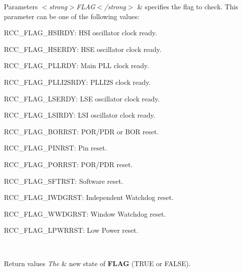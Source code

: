 \begin{DoxyParams}{Parameters}
{\em $<$strong$>$\+F\+L\+A\+G$<$/strong$>$} & specifies the flag to check. This parameter can be one of the following values\+: \begin{DoxyItemize}
\item R\+C\+C\+\_\+\+F\+L\+A\+G\+\_\+\+H\+S\+I\+R\+DY\+: H\+SI oscillator clock ready. \item R\+C\+C\+\_\+\+F\+L\+A\+G\+\_\+\+H\+S\+E\+R\+DY\+: H\+SE oscillator clock ready. \item R\+C\+C\+\_\+\+F\+L\+A\+G\+\_\+\+P\+L\+L\+R\+DY\+: Main P\+LL clock ready. \item R\+C\+C\+\_\+\+F\+L\+A\+G\+\_\+\+P\+L\+L\+I2\+S\+R\+DY\+: P\+L\+L\+I2S clock ready. \item R\+C\+C\+\_\+\+F\+L\+A\+G\+\_\+\+L\+S\+E\+R\+DY\+: L\+SE oscillator clock ready. \item R\+C\+C\+\_\+\+F\+L\+A\+G\+\_\+\+L\+S\+I\+R\+DY\+: L\+SI oscillator clock ready. \item R\+C\+C\+\_\+\+F\+L\+A\+G\+\_\+\+B\+O\+R\+R\+ST\+: P\+O\+R/\+P\+DR or B\+OR reset. \item R\+C\+C\+\_\+\+F\+L\+A\+G\+\_\+\+P\+I\+N\+R\+ST\+: Pin reset. \item R\+C\+C\+\_\+\+F\+L\+A\+G\+\_\+\+P\+O\+R\+R\+ST\+: P\+O\+R/\+P\+DR reset. \item R\+C\+C\+\_\+\+F\+L\+A\+G\+\_\+\+S\+F\+T\+R\+ST\+: Software reset. \item R\+C\+C\+\_\+\+F\+L\+A\+G\+\_\+\+I\+W\+D\+G\+R\+ST\+: Independent Watchdog reset. \item R\+C\+C\+\_\+\+F\+L\+A\+G\+\_\+\+W\+W\+D\+G\+R\+ST\+: Window Watchdog reset. \item R\+C\+C\+\_\+\+F\+L\+A\+G\+\_\+\+L\+P\+W\+R\+R\+ST\+: Low Power reset. \end{DoxyItemize}
\\
\hline
\end{DoxyParams}

\begin{DoxyRetVals}{Return values}
{\em The} & new state of {\bfseries{F\+L\+AG}} (T\+R\+UE or F\+A\+L\+SE). \\
\hline
\end{DoxyRetVals}
